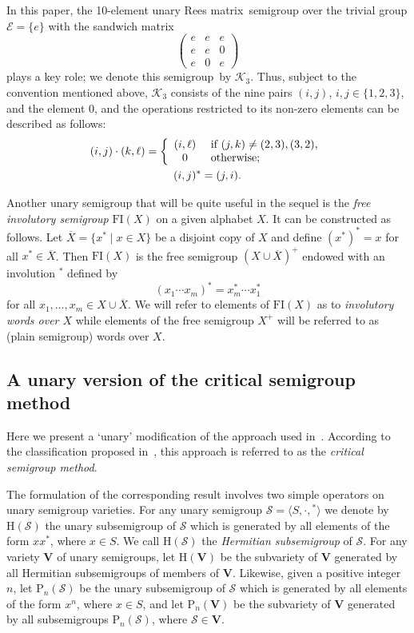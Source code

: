 \documentclass[11pt,reqno]{amsart}
\numberwithin{equation}{section}
\theoremstyle{remark}
\def\Vc{\mathbf{V}}
\def\H{\mathrm H}
\def\P{\mathrm P\!}
\def\Rm{Rees matrix}
\def\sm{semi\-group}
\begin{document}
In this paper, the 10-element unary \Rm\ semigroup over the
trivial group $\mathcal{E}=\{e\}$ with the sandwich matrix
$$\begin{pmatrix}
e & e & e\\
e & e & 0\\
e & 0 & e
\end{pmatrix}$$
plays a key role; we denote this \sm\ by $\mathcal{K}_3$. Thus,
subject to the convention mentioned above, $\mathcal{K}_3$
consists of the nine pairs $(i,j)$, $i,j\in\{1,2,3\}$, and the
element $0$, and the operations restricted to its non-zero
elements can be described as follows:
\begin{gather}
\label{operations in C3}
(i,j)\cdot(k,\ell)=\left\{\begin{array}{cl}
(i,\ell)&\ \text{if}\ (j,k)\ne(2,3),(3,2),\\
0 &\ \text{otherwise};
\end{array}\right.\\
(i,j)^* = (j,i)\notag.
\end{gather}

Another unary semigroup that will be quite useful in the sequel is
the \emph{free involutory semigroup} $\mathrm{FI}(X)$ on a given
alphabet $X$. It can be constructed as follows. Let
$\overline{X}=\{x^*\mid x\in X\}$ be a disjoint copy of $X$ and
define $(x^*)^*=x$ for all $x^*\in \overline{X}$. Then
$\mathrm{FI}(X)$ is the free semigroup $(X\cup\overline{X})^+$
endowed with an involution ${}^*$ defined by
$$(x_1\cdots x_m)^* = x_m^*\cdots x_1^*$$
for all $x_1,\dots,x_m\in X\cup \overline{X}$. We will refer to
elements of $\mathrm{FI}(X)$ as to \emph{involutory words over
$X$} while elements of the free semigroup $X^+$ will be referred
to as (plain semigroup) words over $X$.

\subsection{A unary version of the critical semigroup method}
Here we present a `unary' modification of the approach used in~\cite{V}. According to the classification proposed
in~\cite{volkovjaponicae}, this approach is referred to as the \emph{critical semigroup method}.

The formulation of the corresponding result involves two simple
operators on unary semigroup varieties. For any unary semigroup
$\mathcal{S}=\langle S,\cdot,{}^*\rangle$ we denote by
$\H(\mathcal{S})$ the unary subsemigroup of $\mathcal{S}$ which is
generated by all elements of the form $xx^*$, where $x\in S$. We
call $\H(\mathcal{S})$ the \emph{Hermitian subsemigroup} of
$\mathcal{S}$. For any variety $\Vc$ of unary semigroups, let
$\H(\Vc)$ be the subvariety of $\Vc$ generated by all Hermitian
subsemigroups of members of $\Vc$. Likewise, given a positive
integer $n$, let $\P_n(\mathcal{S})$ be the unary subsemigroup of
$\mathcal{S}$ which is generated by all elements of the form
$x^n$, where $x\in S$, and let $\P_n(\Vc)$ be the subvariety of
$\Vc$ generated by all subsemigroups $\P_n(\mathcal{S})$, where
$\mathcal{S}\in \Vc$.
\end{document}

